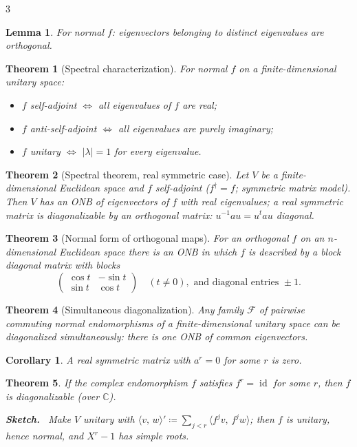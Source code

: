 \documentclass[10pt,a4paper,landscape]{article}
\theoremstyle{definition}
\theoremstyle{plain}
\newtheorem{thm}{Theorem}[section]
\newtheorem{lem}{Lemma}[section]
\newtheorem{cor}{Corollary}[section]
\theoremstyle{remark}
\newcommand{\C}{\mathbb{C}}
\newcommand{\id}{\operatorname{id}}
\newcommand{\abs}[1]{\lvert #1 \rvert}
\newcommand{\deq}{\coloneqq}
\newcommand{\ip}[2]{\langle #1,\, #2 \rangle}
\newenvironment{proofsketch}{%
  \par\small\color{exgray}\textbf{Sketch.}\ }%
  {\par}
\begin{document}
\begin{multicols*}{3}
\begin{lem}
For normal $f$: eigenvectors belonging to distinct eigenvalues are orthogonal.
\end{lem}

\begin{thm}[Spectral characterization]
For normal $f$ on a finite-dimensional unitary space:
\begin{itemize}
\item $f$ self-adjoint $\iff$ all eigenvalues of $f$ are real;
\item $f$ anti-self-adjoint $\iff$ all eigenvalues are purely imaginary;
\item $f$ unitary $\iff$ $\abs{\lambda} = 1$ for every eigenvalue.
\end{itemize}
\end{thm}

\begin{thm}[Spectral theorem, real symmetric case]
Let $V$ be a finite-dimensional Euclidean space and $f$ self-adjoint ($f^{\dagger} = f$; symmetric matrix model). Then $V$ has an ONB of eigenvectors of $f$ with \emph{real} eigenvalues; a real symmetric matrix is diagonalizable by an orthogonal matrix: $u^{-1} a u = u^t a u$ diagonal.
\end{thm}

\begin{thm}[Normal form of orthogonal maps]
For an orthogonal $f$ on an $n$-dimensional Euclidean space there is an ONB in which $f$ is described by a block diagonal matrix with blocks
\[
\begin{pmatrix} \cos t & -\sin t \\ \sin t & \cos t \end{pmatrix} \quad (t \neq 0), \text{ and diagonal entries } \pm 1 .
\]
\end{thm}

\begin{thm}[Simultaneous diagonalization]
Any family $\mathcal{F}$ of pairwise commuting normal endomorphisms of a finite-dimensional unitary space can be diagonalized simultaneously: there is one ONB of common eigenvectors.
\end{thm}

\begin{cor}
A real symmetric matrix with $a^r = 0$ for some $r$ is zero.
\end{cor}

\begin{thm}
If the complex endomorphism $f$ satisfies $f^r = \id$ for some $r$, then $f$ is diagonalizable (over $\C$).
\begin{proofsketch}
Make $V$ unitary with $\ip{v}{w}' \deq \sum_{j<r} \ip{f^{j}v}{f^{j}w}$; then $f$ is unitary, hence normal, and $X^r - 1$ has simple roots.
\end{proofsketch}
\end{thm}


\end{multicols*}
\end{document}
